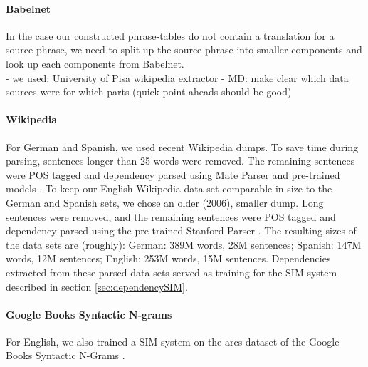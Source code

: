 \documentclass[11pt]{article}
\begin{document}
\paragraph{Babelnet} %
In the case our constructed phrase-tables do not contain a translation for a source phrase, we need to split up the source phrase into smaller components and look up each components from Babelnet. \\
- we used: University of Pisa wikipedia extractor
- MD: make clear which data sources were for which parts (quick point-aheads should be good)

\paragraph{Wikipedia} %
For German and Spanish, we used recent Wikipedia dumps. To save time during parsing, sentences longer than 25 words were removed. The remaining sentences were POS tagged and dependency parsed using Mate Parser and pre-trained models \cite{bohnet:10,bohnet:kuhn:12,seeker:kuhn:13}. To keep our English Wikipedia data set comparable in size to the German and Spanish sets, we chose an older (2006), smaller dump. Long sentences were removed, and the remaining sentences were POS tagged and dependency parsed using the pre-trained Stanford Parser \cite{klein:manning:03,marneffe:maccartney:ea:06}. The resulting sizes of the data sets are (roughly): German: 389M words, 28M sentences; Spanish: 147M words, 12M sentences; English: 253M words, 15M sentences. Dependencies extracted from these parsed data sets served as training for the SIM system described in section \ref{sec:dependencySIM}.

\paragraph{Google Books Syntactic N-grams}
For English, we also trained a SIM system on the arcs dataset of the Google Books Syntactic N-Grams \cite{goldberg:orwant:13}.%
\end{document}
